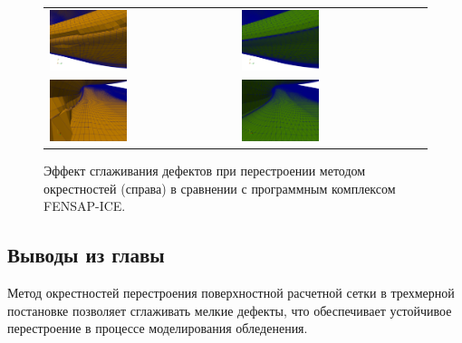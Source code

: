 \begin{figure}[!ht]
\centering
\begin{tabular}{ll}
\includegraphics[width=0.43\textwidth]{pics/text_1_remesh_3d/fens1.png}
&
\includegraphics[width=0.43\textwidth]{pics/text_1_remesh_3d/crys1.png} \\
\includegraphics[width=0.43\textwidth]{pics/text_1_remesh_3d/fens2.png}
&
\includegraphics[width=0.43\textwidth]{pics/text_1_remesh_3d/crys2.png}
\end{tabular}
\singlespacing
\caption{Эффект сглаживания дефектов при перестроении методом окрестностей (справа) в сравнении с программным комплексом FENSAP-ICE.}
\label{fig:text_1_remesh3_with_fensap}
\end{figure}


\subsection{Выводы из главы}

Метод окрестностей перестроения поверхностной расчетной сетки в трехмерной постановке позволяет сглаживать мелкие дефекты, что обеспечивает устойчивое перестроение в процессе моделирования обледенения.


